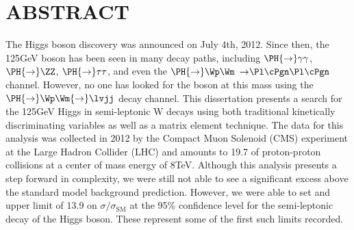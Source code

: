 %
%
%

\chapter*{ABSTRACT}

\pagestyle{plain} %
\setcounter{page}{2}

\indent The Higgs boson discovery was announced on July 4th, 2012. Since then, the 125\unit{\GeV} boson has been seen in many decay paths, including $\PH{\rightarrow}\gamma\gamma$, $\PH{\rightarrow}\ZZ$, $\PH{\rightarrow}\tau\tau$, and even the $\PH{\rightarrow}\Wp\Wm$ ${\rightarrow}\Pl\cPgn\Pl\cPgn$ channel.
However, no one has looked for the boson at this mass using the $\PH{\rightarrow}\Wp\Wm{\rightarrow}\lvjj$ decay channel.
This dissertation presents a search for the 125\unit{\GeV} Higgs in semi-leptonic W decays using both traditional kinetically discriminating variables as well as a matrix element technique.
The data for this analysis was collected in 2012 by the Compact Muon Solenoid (CMS) experiment at the Large Hadron Collider (LHC) and amounts to 19.7\unit{\fbinv} of proton-proton collisions at a center of mass energy of 8\unit{\TeV}.
Although this analysis presents a step forward in complexity, we were still not able to see a significant excess above the standard model background prediction.
However, we were able to set and upper limit of 13.9 on $\sigma/\sigma_{\text{SM}}$ at the 95\% confidence level for the semi-leptonic \W decay of the Higgs boson.
These represent some of the first such limits recorded.


 

\pagebreak{}



